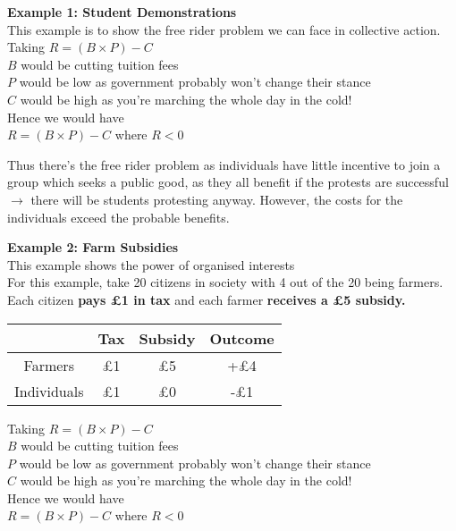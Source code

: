 \documentclass[12pt, letterpaper]{article}
\begin{document}
\begin{center}
\textbf{Example 1: Student Demonstrations} \\
This example is to show the free rider problem we can face in collective action. \\
Taking $R=(B \times P) - C$ \\
$B$ would be cutting tuition fees \\
$P$ would be low as government probably won't change their stance \\
$C$ would be high as you're marching the whole day in the cold! \\
Hence we would have \\
$R=(B \times P) - C$ where $R<0$
\end{center}

Thus there's the free rider problem as individuals have little incentive to join a group which seeks a public good, as they all benefit if the protests are successful $\rightarrow$ there will be students protesting anyway. However, the costs for the individuals exceed the probable benefits.

\begin{center}
\textbf{Example 2: Farm Subsidies} \\
This example shows the power of organised interests \\
For this example, take 20 citizens in society with 4 out of the 20 being farmers. Each citizen \textbf{pays £1 in tax} and each farmer \textbf{receives a £5 subsidy.}

\begin{center}
\begin{tabular}{|c|c|c|c|}

	\hline
	& Tax & Subsidy & Outcome \\
	\hline
	\hline
	Farmers & £1 & £5 & +£4 \\
	\hline
	Individuals & £1 & £0 & -£1 \\
	\hline

\end{tabular}
\end{center}

Taking $R=(B \times P) - C$ \\
$B$ would be cutting tuition fees \\
$P$ would be low as government probably won't change their stance \\
$C$ would be high as you're marching the whole day in the cold! \\
Hence we would have \\
$R=(B \times P) - C$ where $R<0$
\end{center}
\end{document}
